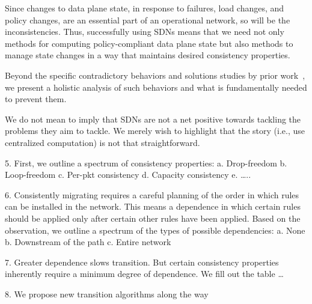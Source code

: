 Since changes to data plane state, in response to failures, load changes, and policy changes, are an essential part of an operational network, so will be the inconsistencies. Thus, successfully using SDNs means that we need not only methods for computing policy-compliant data plane state but also methods to manage state changes in a way that maintains desired consistency properties.

Beyond the specific contradictory behaviors and solutions studies by prior work~\cite{safeupdate,swan}, we present a holistic analysis of such behaviors and what is fundamentally needed to prevent them.

We do not mean to imply that SDNs are not a net positive towards tackling the problems they aim to tackle. We merely wish to highlight that the story (i.e., use centralized computation) is not that straightforward.


5.	First, we outline a spectrum of consistency properties:
a.	Drop-freedom
b.	Loop-freedom
c.	Per-pkt consistency
d.	Capacity consistency
e.	…..

6.	Consistently migrating requires a careful planning of the order in which rules can be installed in the network. This means a dependence in which certain rules should be applied only after certain other rules have been applied.  Based on the observation, we outline a spectrum of the types of possible dependencies:
a.	None
b.	Downstream of the path
c.	Entire network

7.	Greater dependence slows transition. But certain consistency properties inherently require a minimum degree of dependence. We fill out the table …

8.	We propose new transition algorithms along the way
